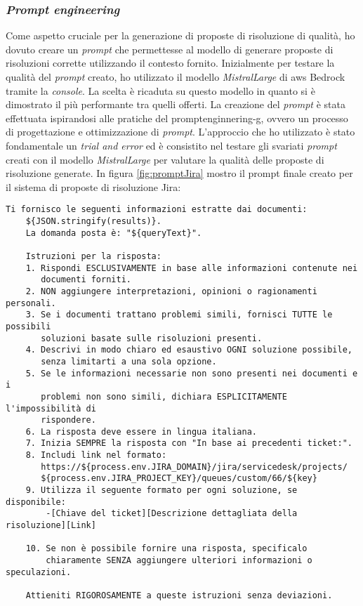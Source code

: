 \subsubsection{\textit{Prompt engineering}}
Come aspetto cruciale per la generazione di proposte di risoluzione di qualità, ho dovuto creare un \textit{prompt} che permettesse al modello di generare proposte di risoluzioni corrette utilizzando il contesto fornito. Inizialmente per testare la qualità del \textit{prompt} creato, ho utilizzato il modello \textit{MistralLarge} di \gls{aws} Bedrock tramite la \textit{console}. La scelta è ricaduta su questo modello in quanto si è dimostrato il più performante tra quelli offerti.
La creazione del \textit{prompt} è stata effettuata ispirandosi alle pratiche del \gls{promptenginnering-g}, ovvero un processo di progettazione e ottimizzazione di \textit{prompt}. L'approccio che ho utilizzato è stato fondamentale un \textit{trial and error} ed è consistito nel testare gli svariati \textit{prompt} creati con il modello \textit{MistralLarge} per valutare la qualità delle proposte di risoluzione generate.
In figura \ref{fig:promptJira} mostro il prompt finale creato per il sistema di proposte di risoluzione Jira:
\begin{Verbatim}[frame=single, fontsize=\small]
    Ti fornisco le seguenti informazioni estratte dai documenti:
    ${JSON.stringify(results)}.
    La domanda posta è: "${queryText}".
    
    Istruzioni per la risposta:
    1. Rispondi ESCLUSIVAMENTE in base alle informazioni contenute nei 
       documenti forniti.
    2. NON aggiungere interpretazioni, opinioni o ragionamenti personali.
    3. Se i documenti trattano problemi simili, fornisci TUTTE le possibili 
       soluzioni basate sulle risoluzioni presenti.
    4. Descrivi in modo chiaro ed esaustivo OGNI soluzione possibile, 
       senza limitarti a una sola opzione.
    5. Se le informazioni necessarie non sono presenti nei documenti e i 
       problemi non sono simili, dichiara ESPLICITAMENTE l'impossibilità di 
       rispondere.
    6. La risposta deve essere in lingua italiana.
    7. Inizia SEMPRE la risposta con "In base ai precedenti ticket:".
    8. Includi link nel formato:
       https://${process.env.JIRA_DOMAIN}/jira/servicedesk/projects/
       ${process.env.JIRA_PROJECT_KEY}/queues/custom/66/${key}
    9. Utilizza il seguente formato per ogni soluzione, se disponibile:
        -[Chiave del ticket][Descrizione dettagliata della risoluzione][Link]
    
    10. Se non è possibile fornire una risposta, specificalo 
        chiaramente SENZA aggiungere ulteriori informazioni o speculazioni.
    
    Attieniti RIGOROSAMENTE a queste istruzioni senza deviazioni.
\end{Verbatim}
\vspace{-0.5cm}
\label{fig:promptJira}
\vspace{0.3cm}


